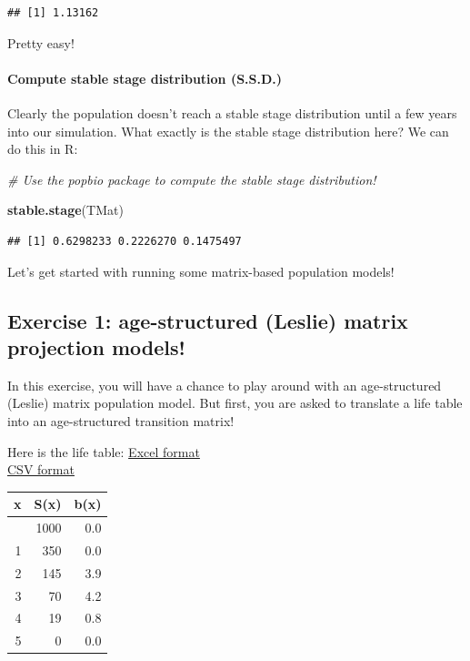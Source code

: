 \documentclass[
]{article}
\newenvironment{Shaded}{\begin{snugshade}}{\end{snugshade}}
\newcommand{\CommentTok}[1]{\textcolor[rgb]{0.56,0.35,0.01}{\textit{#1}}}
\newcommand{\FunctionTok}[1]{\textcolor[rgb]{0.13,0.29,0.53}{\textbf{#1}}}
\newcommand{\NormalTok}[1]{#1}
\begin{document}
\begin{verbatim}
## [1] 1.13162
\end{verbatim}

Pretty easy!

\hypertarget{compute-stable-stage-distribution-s.s.d.}{%
\paragraph{Compute stable stage distribution
(S.S.D.)}\label{compute-stable-stage-distribution-s.s.d.}}

Clearly the population doesn't reach a stable stage distribution until a
few years into our simulation. What exactly is the stable stage
distribution here? We can do this in R:

\begin{Shaded}
\begin{Highlighting}[]
\CommentTok{\# Use the \textquotesingle{}popbio\textquotesingle{} package to compute the stable stage distribution!}

\FunctionTok{stable.stage}\NormalTok{(TMat)}
\end{Highlighting}
\end{Shaded}

\begin{verbatim}
## [1] 0.6298233 0.2226270 0.1475497
\end{verbatim}

Let's get started with running some matrix-based population models!

\hypertarget{exercise-1-age-structured-leslie-matrix-projection-models}{%
\subsection{Exercise 1: age-structured (Leslie) matrix projection
models!}\label{exercise-1-age-structured-leslie-matrix-projection-models}}

In this exercise, you will have a chance to play around with an
age-structured (Leslie) matrix population model. But first, you are
asked to translate a life table into an age-structured transition
matrix!

Here is the life table: \href{life_table4.xlsx}{Excel format}\\
\href{life_table4.csv}{CSV format}

\begin{longtable}[]{@{}rrr@{}}
\toprule\noalign{}
x & S(x) & b(x) \\
\midrule\noalign{}
\endhead
\bottomrule\noalign{}
\endlastfoot
0 & 1000 & 0.0 \\
1 & 350 & 0.0 \\
2 & 145 & 3.9 \\
3 & 70 & 4.2 \\
4 & 19 & 0.8 \\
5 & 0 & 0.0 \\
\end{longtable}
\end{document}
